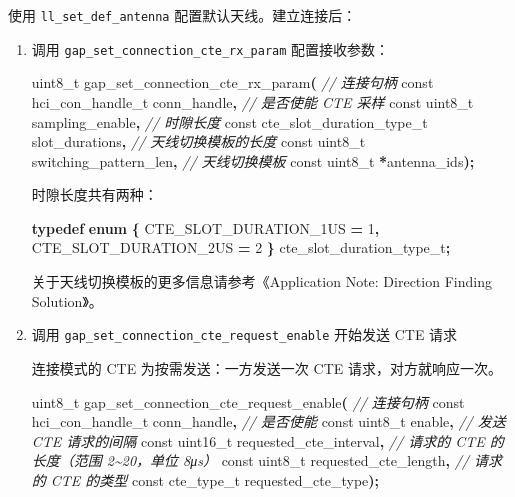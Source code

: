 \documentclass[
  12pt,
]{book}
\newenvironment{Shaded}{\begin{snugshade}}{\end{snugshade}}
\newcommand{\CommentTok}[1]{\textcolor[rgb]{0.56,0.35,0.01}{\textit{#1}}}
\newcommand{\DataTypeTok}[1]{\textcolor[rgb]{0.13,0.29,0.53}{#1}}
\newcommand{\DecValTok}[1]{\textcolor[rgb]{0.00,0.00,0.81}{#1}}
\newcommand{\KeywordTok}[1]{\textcolor[rgb]{0.13,0.29,0.53}{\textbf{#1}}}
\newcommand{\NormalTok}[1]{#1}
\newcommand{\OperatorTok}[1]{\textcolor[rgb]{0.81,0.36,0.00}{\textbf{#1}}}
\begin{document}
使用 \texttt{ll\_set\_def\_antenna} 配置默认天线。建立连接后：

\begin{enumerate}
\def\labelenumi{\arabic{enumi}.}
\item
  调用 \texttt{gap\_set\_connection\_cte\_rx\_param} 配置接收参数：

\begin{Shaded}
\begin{Highlighting}[]
\DataTypeTok{uint8\_t}\NormalTok{ gap\_set\_connection\_cte\_rx\_param}\OperatorTok{(}
  \CommentTok{// 连接句柄}
  \DataTypeTok{const}\NormalTok{ hci\_con\_handle\_t  conn\_handle}\OperatorTok{,}
  \CommentTok{// 是否使能 CTE 采样}
  \DataTypeTok{const} \DataTypeTok{uint8\_t}\NormalTok{           sampling\_enable}\OperatorTok{,}
  \CommentTok{// 时隙长度}
  \DataTypeTok{const}\NormalTok{ cte\_slot\_duration\_type\_t slot\_durations}\OperatorTok{,}
  \CommentTok{// 天线切换模板的长度}
  \DataTypeTok{const} \DataTypeTok{uint8\_t}\NormalTok{           switching\_pattern\_len}\OperatorTok{,}
  \CommentTok{// 天线切换模板}
  \DataTypeTok{const} \DataTypeTok{uint8\_t}          \OperatorTok{*}\NormalTok{antenna\_ids}\OperatorTok{);}
\end{Highlighting}
\end{Shaded}

  时隙长度共有两种：

\begin{Shaded}
\begin{Highlighting}[]
\KeywordTok{typedef} \KeywordTok{enum}
\OperatorTok{\{}
\NormalTok{    CTE\_SLOT\_DURATION\_1US }\OperatorTok{=} \DecValTok{1}\OperatorTok{,}
\NormalTok{    CTE\_SLOT\_DURATION\_2US }\OperatorTok{=} \DecValTok{2}
\OperatorTok{\}}\NormalTok{ cte\_slot\_duration\_type\_t}\OperatorTok{;}
\end{Highlighting}
\end{Shaded}

  关于天线切换模板的更多信息请参考《Application Note: Direction Finding Solution》。
\item
  调用 \texttt{gap\_set\_connection\_cte\_request\_enable} 开始发送 CTE 请求

  连接模式的 CTE 为按需发送：一方发送一次 CTE 请求，对方就响应一次。

\begin{Shaded}
\begin{Highlighting}[]
\DataTypeTok{uint8\_t}\NormalTok{ gap\_set\_connection\_cte\_request\_enable}\OperatorTok{(}
  \CommentTok{// 连接句柄}
  \DataTypeTok{const}\NormalTok{ hci\_con\_handle\_t  conn\_handle}\OperatorTok{,}
  \CommentTok{// 是否使能}
  \DataTypeTok{const} \DataTypeTok{uint8\_t}\NormalTok{           enable}\OperatorTok{,}
  \CommentTok{// 发送 CTE 请求的间隔}
  \DataTypeTok{const} \DataTypeTok{uint16\_t}\NormalTok{          requested\_cte\_interval}\OperatorTok{,}
  \CommentTok{// 请求的 CTE 的长度（范围 2\textasciitilde{}20，单位 8μs）}
  \DataTypeTok{const} \DataTypeTok{uint8\_t}\NormalTok{           requested\_cte\_length}\OperatorTok{,}
  \CommentTok{// 请求的 CTE 的类型}
  \DataTypeTok{const}\NormalTok{ cte\_type\_t        requested\_cte\_type}\OperatorTok{);}
\end{Highlighting}
\end{Shaded}


\end{enumerate}
\end{document}
